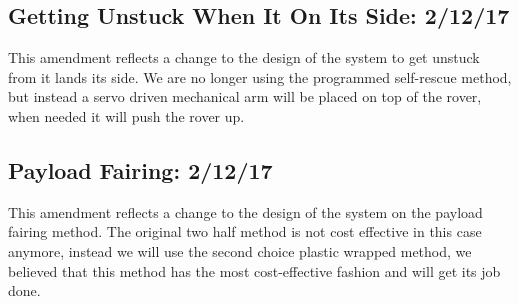 \documentclass[10pt,letterpaper,onecolumn,journal]{IEEEtran}
\begin{document}
\subsection{Getting Unstuck When It On Its Side: 2/12/17}
This amendment reflects a change to the design of the system to get unstuck from it lands its side. We are no longer using the programmed self-rescue method, but instead a servo driven mechanical arm will be placed on top of the rover, when needed it will push the rover up.\vspace{.3cm}
\par

\subsection{Payload Fairing: 2/12/17}
This amendment reflects a change to the design of the system on the payload fairing method. The original two half method is not cost effective in this case anymore, instead we will use the second choice plastic wrapped method, we believed that this method has the most cost-effective fashion and will get its job done.\vspace{.3cm}
\par
\end{document}
